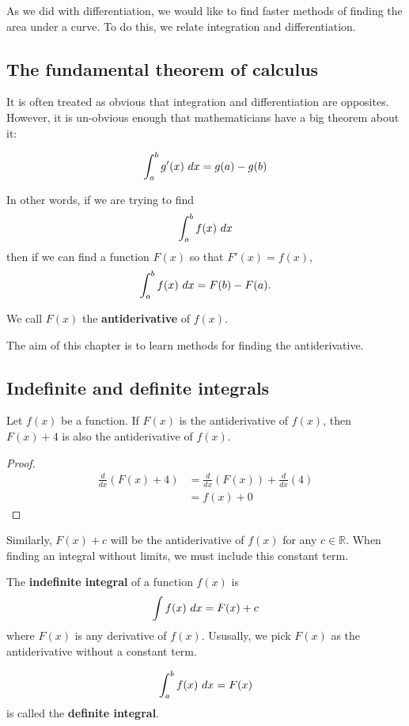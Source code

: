 As we did with differentiation, we would like to find faster methods of finding the area under a curve. To do this, we relate integration and differentiation.

\subsection{The fundamental theorem of calculus}
It is often treated as obvious that integration and differentiation are opposites. However, it is un-obvious enough that mathematicians have a big
theorem about it:
\begin{theorem}
\[\int_a^b g'(x) \ dx = g(a)-g(b)\]
\end{theorem}

In other words, if we are trying to find
\[\int_a^b f(x)\ dx\]
then if we can find a function $F(x)$ so that $F'(x)=f(x)$,
\[\int_a^b f(x)\ dx=F(b)-F(a).\]

\begin{definition}
We call $F(x)$ the \textbf{antiderivative} of $f(x)$.
\end{definition}

The aim of this chapter is to learn methods for finding the antiderivative.

\subsection{Indefinite and definite integrals}

Let $f(x)$ be a function. If $F(x)$ is the antiderivative of $f(x)$, then $F(x)+4$ is also the antiderivative of $f(x)$.
\begin{proof}
\begin{align*}
\frac{d}{dx}\left(F(x)+4\right)&=\frac{d}{dx}\left(F(x)\right)+\frac{d}{dx}\left(4\right)\\&=f(x)+0
\end{align*}
\end{proof}

Similarly, $F(x)+c$ will be the antiderivative of $f(x)$ for any $c\in\mathbb{R}$. When finding an integral without limits, we must include this
constant term.

\begin{definition}
The \textbf{indefinite integral} of a function $f(x)$ is \[\int f(x)\ dx = F(x) + c\]
where $F(x)$ is any derivative of $f(x)$. Ususally, we pick $F(x)$ as the antiderivative without a constant term.
\end{definition}
\begin{definition}
\[\int_a^b f(x)\ dx = F(x)\] is called the \textbf{definite integral}.
\end{definition}

